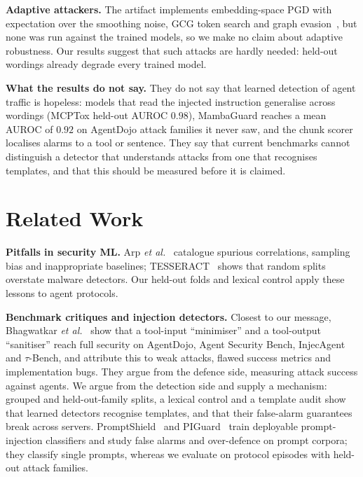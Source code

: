 \documentclass[conference,compsoc]{IEEEtran}
\begin{document}
\textbf{Adaptive attackers.} The artifact implements embedding-space PGD with expectation over the smoothing noise, GCG token search and graph evasion~\cite{Athalye2018Obfuscated,Zou2023GCG,Nasr2026Attacker,Tramer2020Adaptive}, but none was run against the trained models, so we make no claim about adaptive robustness. Our results suggest that such attacks are hardly needed: held-out wordings already degrade every trained model.

\textbf{What the results do not say.} They do not say that learned detection of agent traffic is hopeless: models that read the injected instruction generalise across wordings (MCPTox held-out AUROC $0.98$), MambaGuard reaches a mean AUROC of $0.92$ on AgentDojo attack families it never saw, and the chunk scorer localises alarms to a tool or sentence. They say that current benchmarks cannot distinguish a detector that understands attacks from one that recognises templates, and that this should be measured before it is claimed.

\section{Related Work}
\label{sec:related}
\textbf{Pitfalls in security ML.} Arp \textit{et al.}~\cite{Arp2022DosDonts} catalogue spurious correlations, sampling bias and inappropriate baselines; TESSERACT~\cite{Pendlebury2019Tesseract} shows that random splits overstate malware detectors. Our held-out folds and lexical control apply these lessons to agent protocols.

\textbf{Benchmark critiques and injection detectors.} Closest to our message, Bhagwatkar \textit{et al.}~\cite{Bhagwatkar2025Firewalls} show that a tool-input ``minimiser'' and a tool-output ``sanitiser'' reach full security on AgentDojo, Agent Security Bench, InjecAgent and $\tau$-Bench, and attribute this to weak attacks, flawed success metrics and implementation bugs. They argue from the defence side, measuring attack success against agents. We argue from the detection side and supply a mechanism: grouped and held-out-family splits, a lexical control and a template audit show that learned detectors recognise templates, and that their false-alarm guarantees break across servers. PromptShield~\cite{Jacob2025PromptShield} and PIGuard~\cite{Li2025PIGuard} train deployable prompt-injection classifiers and study false alarms and over-defence on prompt corpora; they classify single prompts, whereas we evaluate on protocol episodes with held-out attack families.
\end{document}
